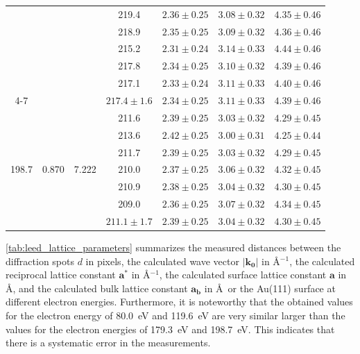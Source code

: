 \documentclass[fontsize=11pt,reqno,a4paper,oneside]{scrartcl}
\begin{document}
\begin{table}[htbp]
\begin{tabular}{@{}ccccccc@{}}
                & & & 219.4 & $2.36 \pm 0.25$ & $3.08 \pm 0.32$ & $4.35 \pm 0.46$ \\
                & & & 218.9 & $2.35 \pm 0.25$ & $3.09 \pm 0.32$ & $4.36 \pm 0.46$ \\
                & & & 215.2 & $2.31 \pm 0.24$ & $3.14 \pm 0.33$ & $4.44 \pm 0.46$ \\
                & & & 217.8 & $2.34 \pm 0.25$ & $3.10 \pm 0.32$ & $4.39 \pm 0.46$ \\
                & & & 217.1 & $2.33 \pm 0.24$ & $3.11 \pm 0.33$ & $4.40 \pm 0.46$ \\
                \cmidrule{4-7}
                & & & $217.4 \pm 1.6$ & $2.34 \pm 0.25$ & $3.11 \pm 0.33$ & $4.39 \pm 0.46$ \\
                \midrule \midrule
                \multirow{7}{*}{198.7} & \multirow{7}{*}{0.870} & \multirow{7}{*}{7.222} & 211.6 & $2.39 \pm 0.25$ & $3.03 \pm 0.32$ & $4.29 \pm 0.45$ \\
                & & & 213.6 & $2.42 \pm 0.25$ & $3.00 \pm 0.31$ & $4.25 \pm 0.44$ \\
                & & & 211.7 & $2.39 \pm 0.25$ & $3.03 \pm 0.32$ & $4.29 \pm 0.45$ \\
                & & & 210.0 & $2.37 \pm 0.25$ & $3.06 \pm 0.32$ & $4.32 \pm 0.45$ \\
                & & & 210.9 & $2.38 \pm 0.25$ & $3.04 \pm 0.32$ & $4.30 \pm 0.45$ \\
                & & & 209.0 & $2.36 \pm 0.25$ & $3.07 \pm 0.32$ & $4.34 \pm 0.45$ \\
                \midrule
                & & & $211.1 \pm 1.7$ & $2.39 \pm 0.25$ & $3.04 \pm 0.32$ & $4.30 \pm 0.45$ \\
                \bottomrule
            \end{tabular}
    \label{tab:leed_lattice_parameters}
\end{table}

\autoref{tab:leed_lattice_parameters} summarizes the measured distances between the diffraction spots $d$ in pixels, the calculated wave vector $|\mathbf{k_0}|$ in \AA$^{-1}$, the calculated reciprocal lattice constant $\mathbf{a^*}$ in \AA$^{-1}$, the calculated surface lattice constant $\mathbf{a}$ in \AA, and the calculated bulk lattice constant $\mathbf{a_b}$ in \AA~or the Au(111) surface at different electron energies. Furthermore, it is noteworthy that the obtained values for the electron energy of 80.0~\si{eV} and 119.6~\si{eV} are very similar larger than the values for the electron energies of 179.3~\si{eV} and 198.7~\si{eV}. This indicates that there is a systematic error in the measurements.
\end{document}

